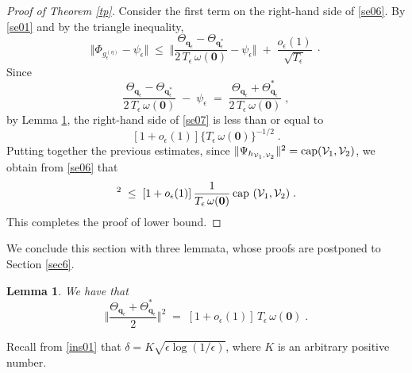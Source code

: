 \documentclass[reqno]{amsart}
\newtheorem{lemma}[theorem]{Lemma}
\newcommand{\mc}[1]{{\mathcal #1}}
\newcommand{\bs}[1]{{\boldsymbol #1}}
\newcommand{\<}{\langle}
\renewcommand{\>}{\rangle}
\begin{document}
\begin{proof}[Proof of Theorem \ref{tp}]
Consider the first term on the right-hand side of \eqref{se06}.
By \eqref{se01} and by the triangle inequality,
\begin{equation}
\label{se07}
\big\Vert \Phi_{g_{\epsilon}^{(\eta)}} -
\psi_{\epsilon} \big\Vert \;\le\;
\Big\Vert \frac{\Theta_{\bs{q}_{\epsilon}} -
  \Theta_{\bs{q}_{\epsilon}^{*}}} {2\, T_{\epsilon}\, \omega(\bs{0})}
- \psi_{\epsilon} \Big\Vert \;+\;
\frac{o_{\epsilon}(1)}{\sqrt{T_{\epsilon}}}\;\cdot
\end{equation}
Since
\begin{equation*}
\frac{\Theta_{\bs{q}_{\epsilon}} - \Theta_{\bs{q}_{\epsilon}^{*}}}
{2\, T_{\epsilon}\, \omega(\bs{0})} \;-\; \psi_{\epsilon}\;=\;
\frac{\Theta_{\bs{q}_{\epsilon}}+\Theta_{\bs{q}_{\epsilon}}^{*}}
{2\, T_{\epsilon}\, \omega(\bs{0})}\;,
\end{equation*}
by Lemma \ref{tp0}, the right-hand side of \eqref{se07} is less than
or equal to
$$[1+o_{\epsilon}(1)] \{T_{\epsilon}\,
\omega(\bs{0})\}^{-1/2}\;.$$
Putting together the previous estimates,
since $\Vert \Psi_{h_{\mc{V}_{1},\mc{V}_{2}}} \Vert ^{2} =
\textup{cap}(\mc{V}_{1},\mc{V}_{2})$, we obtain from \eqref{se06} that
\begin{equation*}
[1+o_{\epsilon}(1)]^{2} \;\le\;
[1+o_{\epsilon}(1)] \, \frac 1{T_{\epsilon}\, \omega(\bs{0})}
\, \textup{cap }(\mc{V}_{1},\mc{V}_{2})\;.
\end{equation*}
This completes the proof of lower bound.
\end{proof}

We conclude this section with three lemmata, whose proofs are
postponed to Section \ref{sec6}.

\begin{lemma}
\label{tp0}
We have that
\begin{equation*}
\Big \Vert \frac{\Theta_{\bs{q}_{\epsilon}}+\Theta_{\bs{q}_{\epsilon}}^{*}}{2}
\Big\Vert ^{2}\;=\;\left[1+o_{\epsilon}(1)\right]\,T_{\epsilon}\,\omega(\bs{0})\;.
\end{equation*}
\end{lemma}

Recall from \eqref{ins01} that $\delta= K \sqrt{\epsilon
  \log(1/\epsilon)}$, where $K$ is an arbitrary positive number.
\end{document}
